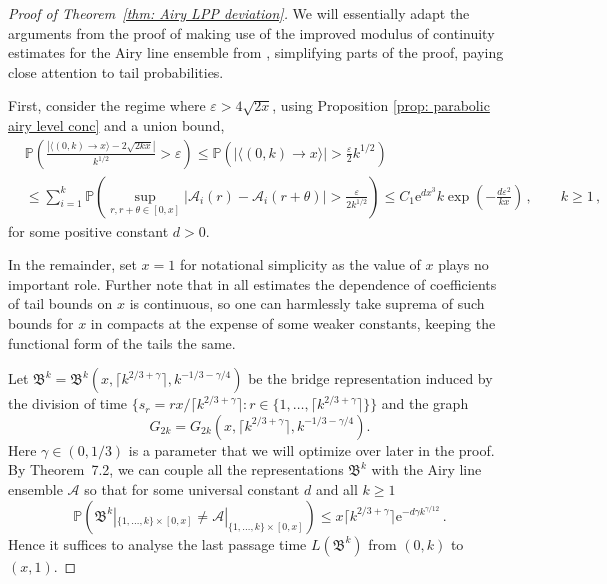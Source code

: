\documentclass[11pt, reqno]{amsart}
\numberwithin{equation}{section}
\newcommand{\PP}{\ensuremath{\mathbb{P}}}
\newcommand{\ceil}[1]{\lceil #1 \rceil}
\begin{document}
\begin{proof}[Proof of Theorem~\ref{thm: Airy LPP deviation}]
We will essentially adapt the arguments from the proof of \cite[Theorem~6.7]{DOV} making use of the improved modulus of continuity estimates for the Airy line ensemble from \cite{wu2025applicationsoptimaltransportdyson}, simplifying parts of the proof, paying close attention to tail probabilities.

First, consider the regime where $\varepsilon > 4\sqrt{2x}$, using Proposition \ref{prop: parabolic airy level conc} and a union bound,
\begin{align*}
& \PP \left(\frac{|\langle (0, k) \rightarrow x \rangle-{2\sqrt{2kx}}|}{k^{1/2}} > \varepsilon\right) \le \PP \left(|\langle (0, k) \rightarrow x \rangle| > \frac{\varepsilon}{2}k^{1/2}\right)\\
& \le \displaystyle\sum_{i=1}^k\PP\left( \displaystyle\sup_{r,r+\theta \in [0,x]}|\mathcal{A}_{i}(r) - \mathcal{A}_{i}(r + \theta)|> \frac{\varepsilon}{2k^{1/2}}\right)\le C_1\mathrm{e}^{dx^3}k\exp \left( -\frac{d\varepsilon^2}{kx}\right) \,,\qquad k\ge 1\,,
\end{align*}
for some positive constant $d> 0$.

In the remainder, set $x=1$ for notational simplicity as the value of $x$ plays no important role. Further note that in all estimates the dependence of coefficients of tail bounds on $x$ is continuous, so one can harmlessly take suprema of such bounds for $x$ in compacts at the expense of some weaker constants, keeping the functional form of the tails the same.

Let
$
\mathfrak{B}^k =  \mathfrak{B}^k(x, \ceil{k^{2/3 + \gamma}}, k^{-1/3 - \gamma/4})
$
be the bridge representation induced by the division of time $\{s_r = rx/\ceil{k^{2/3 + \gamma}}: r \in \{1, \dots, \ceil{k^{2/3 + \gamma}}\}\}$ and the graph
$$
G_{2k} = G_{2k}(x, \ceil{k^{2/3 + \gamma}}, k^{-1/3 - \gamma/4}).
$$
Here $\gamma \in (0, 1/3)$ is a parameter that we will optimize over later in the proof. By \cite{dauvergne2021}{Theorem~7.2}, we can couple all the representations $\mathfrak{B}^k$ with the Airy line ensemble $\mathcal{A}$ so that for some universal constant $d$ and all $k\ge 1$
\begin{equation}
\label{eq: scrBkcouple}
\PP\left(\mathfrak{B}^k|_{\{1, \dots, k\} \times [0, x]} \ne \mathcal{A}|_{\{1, \dots, k\} \times [0, x]} \right) \le x\lceil k^{2/3+\gamma}\rceil \mathrm{e}^{-d\gamma k^{\gamma/12}}\,.
\end{equation}
Hence it suffices to analyse the last passage time $L(\mathfrak{B}^k)$ from $(0, k)$ to $(x, 1)$.


\end{proof}
\end{document}
